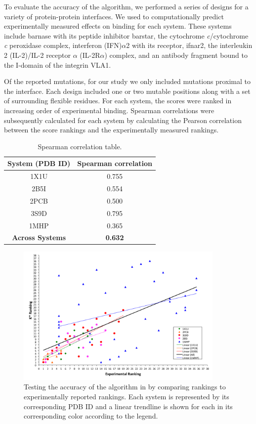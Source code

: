 To evaluate the accuracy of the \osprey \ks algorithm, we performed a series of designs for a variety of protein-protein interfaces. We used \ks to computationally predict experimentally measured effects on binding for each system. These systems include barnase with its peptide inhibitor barstar, the cytochrome {\it c}/cytochrome {\it c} peroxidase complex, interferon (IFN)$\alpha$2 with its receptor, ifnar2, the interleukin 2 (IL-2)/IL-2 receptor $\alpha$ (IL-2R$\alpha$) complex, and an antibody fragment bound to the I-domain of the integrin VLA1. 


Of the reported mutations, for our study we only included mutations proximal to the interface. Each design included one or two mutable positions along with a set of surrounding flexible residues. For each system, the \ks scores were ranked in increasing order of experimental binding. Spearman correlations were subsequently calculated for each system by calculating the Pearson correlation between the \ks score rankings and the experimentally measured rankings. 

\begin{table}[h!]
\centering
\begin{tabular}{ |c||c|  }
 \hline
 \textbf{System (PDB ID)}& \textbf{Spearman correlation} \\
 \hline 
 1X1U   & 0.755 \\
 \hline
 2B5I   & 0.554 \\
 \hline
 2PCB   & 0.500 \\
 \hline
 3S9D   & 0.795 \\
 \hline
 1MHP   & 0.365 \\
 \hline 
 \textbf{Across Systems} &   \textbf{0.632}  \\
 \hline
\end{tabular}
\caption{Spearman correlation table.}
\end{table}

\begin{figure}\label{fig:rankings}
\center
\includegraphics[width=0.9\textwidth]{figures/Rankings.png}
\caption{Testing the accuracy of the \ks algorithm in  by comparing \ks rankings to experimentally reported rankings. Each system is represented by its corresponding PDB ID and a linear trendline is shown for each in its corresponding color according to the legend.}
\end{figure}

